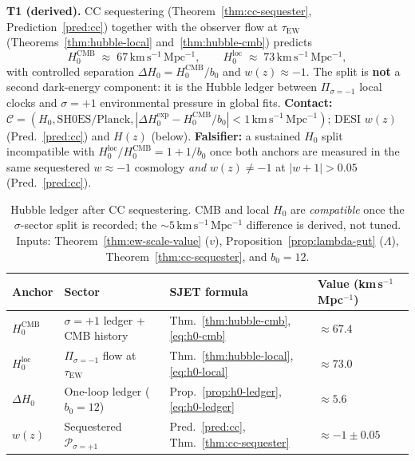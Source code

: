 \begin{prediction}\label{pred:h0}
\textbf{T1 (derived).} CC sequestering (Theorem~\ref{thm:cc-sequester},
Prediction~\ref{pred:cc}) together with the observer flow at
$\tau_{\mathrm{EW}}$ (Theorems~\ref{thm:hubble-local}
and~\ref{thm:hubble-cmb}) predicts
\begin{equation}\label{eq:pred-h0}
  H_0^{\mathrm{CMB}}
  \;\approx\;
  67\,\mathrm{km\,s^{-1}\,Mpc^{-1}},
  \qquad
  H_0^{\mathrm{loc}}
  \;\approx\;
  73\,\mathrm{km\,s^{-1}\,Mpc^{-1}},
\end{equation}
with controlled separation $\Delta H_0=H_0^{\mathrm{CMB}}/b_0$ and
$w(z)\approx -1$. The split is \textbf{not} a second dark-energy component:
it is the Hubble ledger between $\Pi_{\sigma=-1}$ local clocks and
$\sigma=+1$ environmental pressure in global fits.
\textbf{Contact:}
$\mathcal{C}=(H_0,\mathrm{SH0ES/Planck},|\Delta H_0^{\mathrm{exp}}-
H_0^{\mathrm{CMB}}/b_0|<1\,\mathrm{km\,s^{-1}\,Mpc^{-1}})$;
DESI $w(z)$ (Pred.~\ref{pred:cc}) and $H(z)$ (below).
\textbf{Falsifier:} a sustained $H_0$ split incompatible with
$H_0^{\mathrm{loc}}/H_0^{\mathrm{CMB}}=1+1/b_0$ once both anchors are
measured in the same sequestered $w\approx -1$ cosmology \emph{and}
$w(z)\neq -1$ at $|w+1|>0.05$ (Pred.~\ref{pred:cc}).
\end{prediction}

\begin{table}[ht]
\centering
\small
\renewcommand{\arraystretch}{1.14}
\begin{tabular}{@{}llll@{}}
\toprule
\textbf{Anchor} & \textbf{Sector} & \textbf{SJET formula} &
\textbf{Value (km\,s$^{-1}$\,Mpc$^{-1}$)} \\
\midrule
$H_0^{\mathrm{CMB}}$ &
  $\sigma=+1$ ledger + CMB history &
  Thm.~\ref{thm:hubble-cmb}, \eqref{eq:h0-cmb} &
  $\approx 67.4$ \\
$H_0^{\mathrm{loc}}$ &
  $\Pi_{\sigma=-1}$ flow at $\tau_{\mathrm{EW}}$ &
  Thm.~\ref{thm:hubble-local}, \eqref{eq:h0-local} &
  $\approx 73.0$ \\
$\Delta H_0$ &
  One-loop ledger ($b_0=12$) &
  Prop.~\ref{prop:h0-ledger}, \eqref{eq:h0-ledger} &
  $\approx 5.6$ \\
$w(z)$ &
  Sequestered $\mathcal{P}_{\sigma=+1}$ &
  Pred.~\ref{pred:cc}, Thm.~\ref{thm:cc-sequester} &
  $\approx -1\pm 0.05$ \\
\bottomrule
\end{tabular}
\caption{Hubble ledger after CC sequestering. CMB and local $H_0$ are
\emph{compatible} once the $\sigma$-sector split is recorded; the
$\sim 5\,\mathrm{km\,s^{-1}\,Mpc^{-1}}$ difference is derived, not tuned.
Inputs: Theorem~\ref{thm:ew-scale-value} ($v$), Proposition~\ref{prop:lambda-gut}
($\Lambda$), Theorem~\ref{thm:cc-sequester}, and $b_0=12$.}
\label{tab:hubble}
\end{table}

